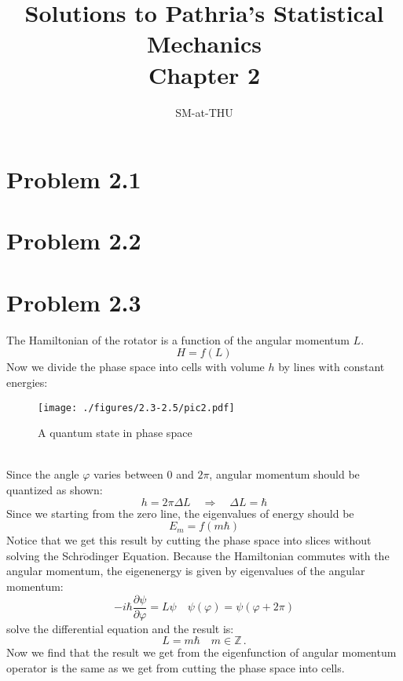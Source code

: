 \documentclass{article}
\author{SM-at-THU}
\title{\bf{Solutions to Pathria's Statistical Mechanics}\\Chapter 2}
\begin{document}
\maketitle
\section*{Problem 2.1}

\section*{Problem 2.2}

\section*{Problem 2.3}
The Hamiltonian of the rotator is a function of the angular momentum $L$. 
$$
H = f(L)
$$
Now we divide the phase space into cells with volume $h$ by lines with constant energies:
\begin{figure}[!htp]
\centering
\texttt{[image: ./figures/2.3-2.5/pic2.pdf]}
\caption{A quantum state in phase space}
\end{figure}\\
Since the angle $\varphi$ varies between $0$ and $2\pi$, angular momentum should be quantized as shown:
$$
h = 2\pi\Delta L\quad \Rightarrow \quad \Delta L =\hbar
$$
Since we starting from the zero line, the eigenvalues of energy should be
\begin{equation}
E_m = f(m\hbar)
\end{equation}
Notice that we get this result by cutting the phase space into slices without solving the Schr$\ddot{\mathrm{o}}$dinger Equation. Because the Hamiltonian commutes with the angular momentum, the eigenenergy is given by eigenvalues of the angular momentum:
$$
-i\hbar \frac{\partial \psi}{\partial\varphi} = L\psi\quad\psi(\varphi) =\psi(\varphi+2\pi)
$$
solve the differential equation and the result is:
$$
L = m\hbar\quad m \in \mathbb{Z}\,.
$$
Now we find that the result we get from the eigenfunction of angular momentum operator is the same as we get from cutting the phase space into cells.
\end{document}
